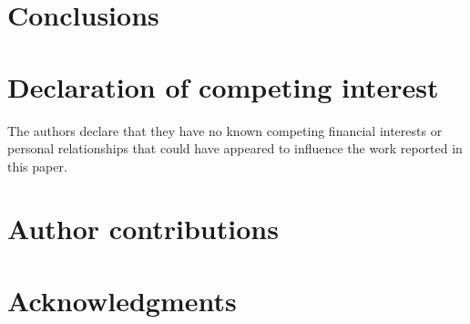 \documentclass[a4paper,fleqn]{cas-dc}
\begin{document}
\section{Conclusions}



\section*{Declaration of competing interest}

The authors declare that they have no known competing financial interests or personal relationships that could have appeared to influence the work reported in this paper.

\section*{Author contributions}



\section*{Acknowledgments}





\end{document}
